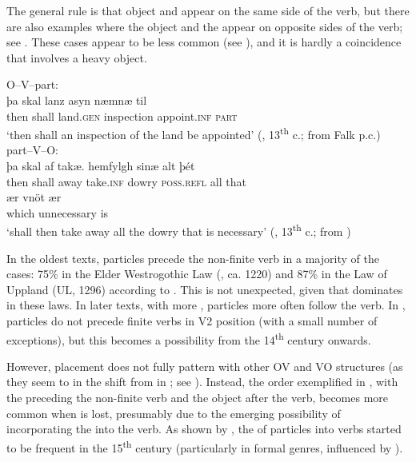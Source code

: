 \documentclass[output=paper]{langscibook}
\begin{document}
The general rule is that object and  appear on the same side of the verb, but there are also examples where the object and the  appear on opposite sides of the verb; see . These cases appear to be less common (see \citealt{Ljunggren1932}), and it is hardly a coincidence that  involves a heavy object.


\ea\label{ex:lalu:22}
\ea\label{ex:lalu:22a} O--V–part:  \\
\gll þa     skal   lanz       asyn       næmnæ       til\\
    then   shall   land.\textsc{gen}   inspection   appoint.\textsc{inf}   \textsc{part} \\
\glt `then shall an inspection of the land be appointed’ (, 13\textsuperscript{th} c.; from Falk p.c.)\\

\ex \label{ex:lalu:22b}part–V–O:     \\
\gll þa     skal   af  takæ.   hemfylgh   sinæ       alt   þét \\
    then   shall   away  take.\textsc{inf}  dowry     \textsc{poss.refl}   all   that \\

\gll ær       vnöt         ær\\
    which   unnecessary   is \\
\glt `shall then take away all the dowry that is necessary’ (, 13\textsuperscript{th} c.; from \citealt{Ljunggren1932})\\
\z
\z



In the oldest texts, particles precede the non-finite verb in a majority of the cases: 75\% in the Elder Westrogothic Law (, ca. 1220) and 87\% in the Law of Uppland (UL, 1296) according to \citet[95]{Ljunggren1932}. This is not unexpected, given that  dominates in these laws. In later texts, with more , particles more often follow the verb. In , particles do not precede finite verbs in V2 position (with a small number of exceptions), but this becomes a possibility from the 14\textsuperscript{th} century onwards. 



However,  placement does not fully pattern with other OV and VO structures (as they seem to in the shift from  in ; see \citealt{Hroarsdottir2008}). Instead, the order exemplified in , with the  preceding the non-finite verb and the object after the verb, becomes more common when  is lost, presumably due to the emerging possibility of incorporating the  into the verb. As shown by \citet{Ljunggren1932,Ljunggren1937}, the  of particles into verbs started to be frequent in the 15\textsuperscript{th} century (particularly in formal genres, influenced by ).
\end{document}
